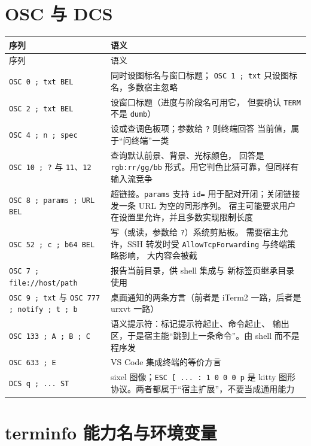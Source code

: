 \documentclass[12pt,a4paper,fontset=fandol]{ctexbook}
\newcommand{\Tp}[1]{\texttt{#1}}
\begin{document}
\section{OSC 与 DCS}

\begin{longtable}{@{}>{\raggedright\arraybackslash}p{}
                 >{\raggedright\arraybackslash}p{}@{}}
\toprule
序列 & 语义 \\
\midrule
\endfirsthead
\toprule
序列 & 语义 \\
\midrule
\endhead
\Tp{OSC 0 ; txt BEL} & 同时设图标名与窗口标题；
\Tp{OSC 1 ; txt} 只设图标名，多数宿主忽略 \\
\Tp{OSC 2 ; txt BEL} & 设窗口标题（进度与阶段名可用它，
但要确认 \Tp{TERM} 不是 \Tp{dumb}） \\
\Tp{OSC 4 ; n ; spec} & 设或查调色板项；参数给 \Tp{?} 则终端回答
当前值，属于``问终端''一类 \\
\Tp{OSC 10 ; ?} 与 \Tp{11}、\Tp{12} & 查询默认前景、背景、光标颜色，
回答是 \Tp{rgb:rr/gg/bb} 形式。用它判色比猜可靠，但同样有输入流竞争 \\
\Tp{OSC 8 ; params ; URL BEL} & 超链接。\Tp{params} 支持
\Tp{id=} 用于配对开闭；关闭链接发一条 URL 为空的同形序列。
宿主可能要求用户在设置里允许，并且多数实现限制长度 \\
\Tp{OSC 52 ; c ; b64 BEL} & 写（或读，参数给 \Tp{?}）系统剪贴板。
需要宿主允许，SSH 转发时受 \Tp{AllowTcpForwarding} 与终端策略影响，
大内容会被截 \\
\Tp{OSC 7 ; file://host/path} & 报告当前目录，供 shell 集成与
新标签页继承目录使用 \\
\Tp{OSC 9 ; txt} 与 \Tp{OSC 777 ; notify ; t ; b} &
桌面通知的两条方言（前者是 iTerm2 一路，后者是 urxvt 一路） \\
\Tp{OSC 133 ; A ; B ; C} & 语义提示符：标记提示符起止、命令起止、
输出区，于是宿主能``跳到上一条命令''。由 shell 而不是程序发 \\
\Tp{OSC 633 ; E} & VS Code 集成终端的等价方言 \\
\Tp{DCS q ; ... ST} & sixel 图像；\Tp{ESC [ ... : 1 0 0 0 p}
是 kitty 图形协议。两者都属于``宿主扩展''，不要当成通用能力 \\
\bottomrule
\end{longtable}

\section{terminfo 能力名与环境变量}
\end{document}
